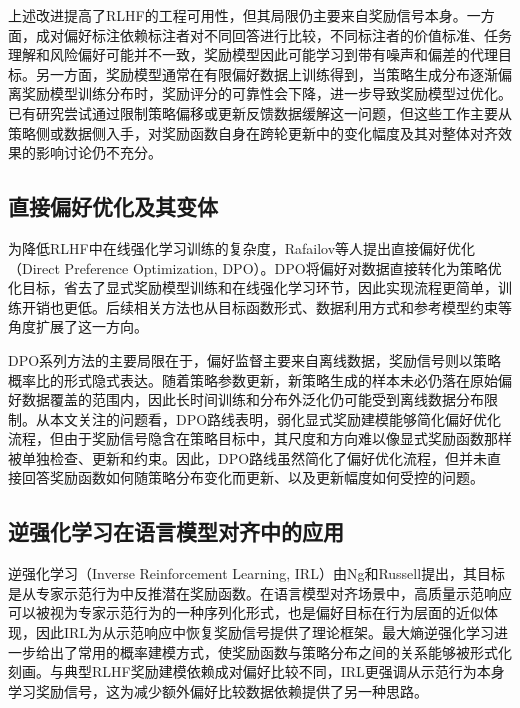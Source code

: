 上述改进提高了RLHF的工程可用性，但其局限仍主要来自奖励信号本身。一方面，成对偏好标注依赖标注者对不同回答进行比较，不同标注者的价值标准、任务理解和风险偏好可能并不一致，奖励模型因此可能学习到带有噪声和偏差的代理目标。另一方面，奖励模型通常在有限偏好数据上训练得到，当策略生成分布逐渐偏离奖励模型训练分布时，奖励评分的可靠性会下降，进一步导致奖励模型过优化\cite{gao2023scaling}。已有研究尝试通过限制策略偏移或更新反馈数据缓解这一问题\cite{moskovitz2023fool,online_rlhf_2025}，但这些工作主要从策略侧或数据侧入手，对奖励函数自身在跨轮更新中的变化幅度及其对整体对齐效果的影响讨论仍不充分。

\subsection{直接偏好优化及其变体}

为降低RLHF中在线强化学习训练的复杂度，Rafailov等人提出直接偏好优化（Direct Preference Optimization, DPO）\cite{rafailov2023direct}。DPO将偏好对数据直接转化为策略优化目标，省去了显式奖励模型训练和在线强化学习环节，因此实现流程更简单，训练开销也更低。后续相关方法也从目标函数形式、数据利用方式和参考模型约束等角度扩展了这一方向\cite{azar2024general,ethayarajh2024kto,meng2024simpo,gorbatovski2025trdpo}。

DPO系列方法的主要局限在于，偏好监督主要来自离线数据，奖励信号则以策略概率比的形式隐式表达。随着策略参数更新，新策略生成的样本未必仍落在原始偏好数据覆盖的范围内，因此长时间训练和分布外泛化仍可能受到离线数据分布限制\cite{tajwar2024preference}。从本文关注的问题看，DPO路线表明，弱化显式奖励建模能够简化偏好优化流程，但由于奖励信号隐含在策略目标中，其尺度和方向难以像显式奖励函数那样被单独检查、更新和约束。因此，DPO路线虽然简化了偏好优化流程，但并未直接回答奖励函数如何随策略分布变化而更新、以及更新幅度如何受控的问题。

\subsection{逆强化学习在语言模型对齐中的应用}

逆强化学习（Inverse Reinforcement Learning, IRL）由Ng和Russell\cite{ng2000algorithms}提出，其目标是从专家示范行为中反推潜在奖励函数。在语言模型对齐场景中，高质量示范响应可以被视为专家示范行为的一种序列化形式，也是偏好目标在行为层面的近似体现，因此IRL为从示范响应中恢复奖励信号提供了理论框架。最大熵逆强化学习\cite{ziebart2008maximum}进一步给出了常用的概率建模方式，使奖励函数与策略分布之间的关系能够被形式化刻画。与典型RLHF奖励建模依赖成对偏好比较不同，IRL更强调从示范行为本身学习奖励信号，这为减少额外偏好比较数据依赖提供了另一种思路。

